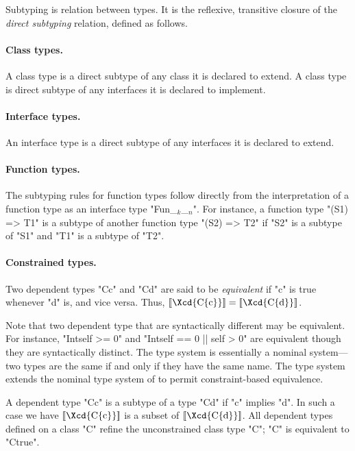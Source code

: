 Subtyping is relation between types.  It is the
reflexive, transitive 
closure of the {\em direct subtyping} relation, defined as
follows.

\paragraph{Class types.}  A class type is a direct subtype of
any
class it is declared to extend.  A class type is direct subtype
of any interfaces it is declared to implement.

\paragraph{Interface types.}  An interface type is a direct
subtype of any interfaces it is declared to extend.

\paragraph{Function types.}

The subtyping rules for function types follow directly from the
interpretation of a function type as an interface type
\xcdmath"Fun_$_k$_$_n$".
For instance,
a function type
\xcd"(S1) => T1" 
is a subtype of another function type
\xcd"(S2) => T2" 
if \xcd"S2" is a subtype of \xcd"S1"
and \xcd"T1" is a subtype of \xcd"T2".

\paragraph{Constrained types.}

Two dependent types \xcd"C{c}" and \xcd"C{d}" are said to be {\em equivalent} if 
\xcd"c" is true whenever \xcd"d" is, and vice versa. Thus, 
$\LL{\mbox{\Xcd{C\{c\}}}} = \LL{\mbox{\Xcd{C\{d\}}}}$.

Note that two dependent type that are syntactically different may be
equivalent. For instance, \xcd"Int{self >= 0}" and
\xcd"Int{self == 0 || self > 0}" are equivalent though they are syntactically
distinct. The \Java{} type system is essentially a nominal system---two
types are the same if and only if they have the same name. The \Xten{}
type system extends the nominal type system of \Java{} to permit
constraint-based equivalence.

A dependent type \xcd"C{c}" is a subtype of a type \xcd"C{d}" if
\xcd"c" implies \xcd"d".  In such a case we have
$\LL{\mbox{\Xcd{C\{c\}}}}$ is a
subset of $\LL{\mbox{\Xcd{C\{d\}}}}$. All dependent types
defined on a class \xcd"C"
refine the unconstrained class type \xcd"C"; \xcd"C" is
equivalent to \xcd"C{true}".

